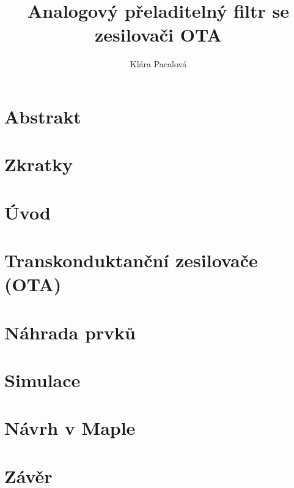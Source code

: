 \documentclass[twoside]{article}
\newcommand{\sekce}[1]{\clearpage \section{#1}}
\newcommand{\nadpis}[1]{\newpage \section*{#1}}
\begin{document}
\title{Analogový přeladitelný filtr se zesilovači OTA}
\author{Klára Pacalová}


\fancyhf[HC]{\bfseries\leftmark}


\thispagestyle{empty} 
\nadpis{}

\thispagestyle{empty} 
\nadpis{}

\thispagestyle{empty} 
\nadpis{Abstrakt}

\renewcommand{\headrulewidth}{0.5pt}

\nadpis{Zkratky}


\newpage
\tableofcontents
\newpage
\listoffigures
\newpage
\listoftables

\sekce{Úvod}

\sekce{Transkonduktanční zesilovače (OTA)}

\sekce{Náhrada prvků}\label{s:NAH}

\sekce{Simulace}

\sekce{Návrh v Maple}\label{s:MAPLE}

\sekce{Závěr}


\renewcommand{\headrulewidth}{0pt}
\fancyhf{}
\end{document}
